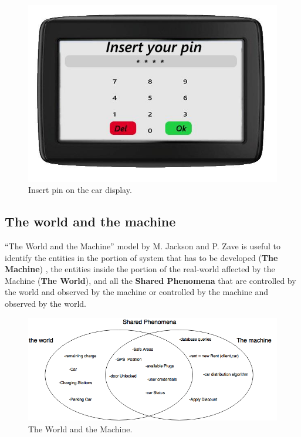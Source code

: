 \begin{figure}[hp]
\centering
\includegraphics[width=400 pt]{resources/nav68.jpg}
\caption{\label{fig:pin}Insert pin on the car display.}
\end{figure}

\subsection{The world and the machine}

“The World and the Machine” model by M. Jackson and P. Zave is useful to identify the entities in the portion of system that has to be developed (\textbf{The Machine}) , the entities inside the portion of the real-world affected by the Machine (\textbf{The World}), and all  the \textbf{Shared Phenomena} that are controlled by the world and observed by the machine  or controlled by the machine and observed by the world.

\begin{figure}[ht]
\centering
\includegraphics[width=400 pt]{resources/worldMachine.png}
\caption{\label{fig:WandM}The World and the Machine.}
\end{figure}
